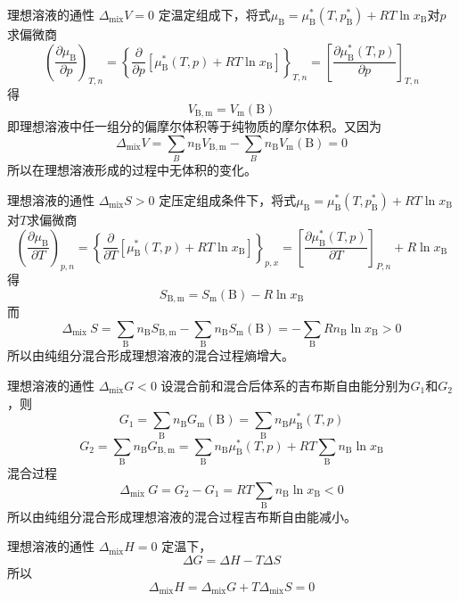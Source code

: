 \begin{frame}{理想溶液的通性 $\Delta_\mathrm{mix}V=0$}
    定温定组成下，将式$\mu_\mathrm{B}=\mu_{\mathrm{B}}^*(T,p_\mathrm{B}^*)+R T \ln x_\mathrm{B}$对$p$求偏微商
    $$\left(\frac{\partial \mu_{\mathrm{B}}}{\partial p}\right)_{T, n}=\left\{\frac{\partial}{\partial p}\left[\mu_{\mathrm{B}}^{*}(T, p)+R T \ln x_{\mathrm{B}}\right]\right\}_{T, n}=\left[\frac{\partial \mu_{\mathrm{B}}^{*}(T, p)}{\partial p}\right]_{T, n}$$
    得
    $$V_\mathrm{B,m}=V_\mathrm{m}(\mathrm{B})$$
    即理想溶液中任一组分的偏摩尔体积等于纯物质的摩尔体积。又因为
    $$\Delta_\mathrm{mix}V=\sum_Bn_\mathrm{B}V_{\mathrm{B,m}}-\sum_Bn_\mathrm{B}V_\mathrm{m}(\mathrm{B})=0$$
    所以在理想溶液形成的过程中无体积的变化。
\end{frame}


\begin{frame}{理想溶液的通性 $\Delta_\mathrm{mix}S>0$}
    定压定组成条件下，将式$\mu_\mathrm{B}=\mu_{\mathrm{B}}^*(T,p_\mathrm{B}^*)+R T \ln x_\mathrm{B}$对$T$求偏微商
    $$\left(\frac{\partial \mu_{\mathrm{B}}}{\partial T}\right)_{p, n}=\left\{\frac{\partial}{\partial T}\left[\mu_{\mathrm{B}}^{*}(T, p)+R T \ln x_{\mathrm{B}}\right]\right\}_{p, x}=\left[\frac{\partial \mu_{\mathrm{B}}^{*}(T, p)}{\partial T}\right]_{P, n}+R\ln x_\mathrm{B}$$
    得
    $$S_\mathrm{B,m}=S_\mathrm{m}(\mathrm{B})-R\ln x_\mathrm{B}$$
    而$$\Delta_{\text {mix }} S=\sum_{\mathrm{B}} n_{\mathrm{B}} S_{\mathrm{B}, \mathrm{m}}-\sum_{\mathrm{B}} n_{\mathrm{B}} S_{\mathrm{m}}(\mathrm{B})=-\sum_{\mathrm{B}} R n_{\mathrm{B}} \ln x_{\mathrm{B}}>0$$
    所以由纯组分混合形成理想溶液的混合过程熵增大。
\end{frame}


\begin{frame}{理想溶液的通性 $\Delta_\mathrm{mix}G<0$}
    设混合前和混合后体系的吉布斯自由能分别为$G_1$和$G_2$，则
    $$G_{1}=\sum_{\mathrm{B}} n_{\mathrm{B}} G_{\mathrm{m}}(\mathrm{B})=\sum_{\mathrm{B}} n_{\mathrm{B}} \mu_{\mathrm{B}}^{*}(T, p)$$
    $$G_{2}=\sum_{\mathrm{B}} n_{\mathrm{B}} G_{\mathrm{B}, \mathrm{m}}=\sum_{\mathrm{B}} n_{\mathrm{B}} \mu_{\mathrm{B}}^{*}(T, p)+R T \sum_{\mathrm{B}} n_{\mathrm{B}} \ln x_{\mathrm{B}}$$
    混合过程
    $$\Delta_{\text {mix }} G=G_{2}-G_{1}=R T \sum_{\mathrm{B}} n_{\mathrm{B}} \ln x_{\mathrm{B}}<0$$
    所以由纯组分混合形成理想溶液的混合过程吉布斯自由能减小。
\end{frame}


\begin{frame}{理想溶液的通性 $\Delta_\mathrm{mix}H=0$}
    定温下，
    $$\Delta G=\Delta H - T\Delta S$$
    所以
    $$\Delta_{\mathrm{mix}} H=\Delta_{\mathrm{mix}} G + T\Delta_{\mathrm{mix}} S = 0$$
\end{frame}


